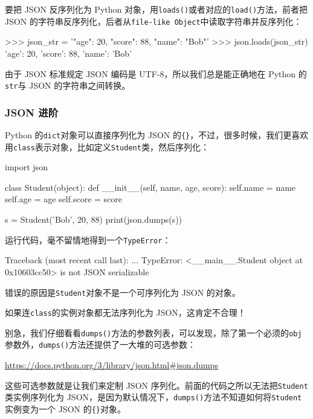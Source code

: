 要把 JSON 反序列化为 Python
对象，用\texttt{loads()}或者对应的\texttt{load()}方法，前者把 JSON
的字符串反序列化，后者从\texttt{file-like\ Object}中读取字符串并反序列化：

\begin{pythoncode}
>>> json_str = '{"age": 20, "score": 88, "name": "Bob"}'
>>> json.loads(json_str)
{'age': 20, 'score': 88, 'name': 'Bob'}
\end{pythoncode}

由于 JSON 标准规定 JSON 编码是 UTF-8，所以我们总是能正确地在 Python
的\texttt{str}与 JSON 的字符串之间转换。

\hypertarget{json-ux8fdbux9636}{%
\subsubsection{JSON 进阶}\label{json-ux8fdbux9636}}

Python 的\texttt{dict}对象可以直接序列化为 JSON
的\texttt{\{\}}，不过，很多时候，我们更喜欢用\texttt{class}表示对象，比如定义\texttt{Student}类，然后序列化：

\begin{pythoncode}
import json

class Student(object):
    def __init__(self, name, age, score):
        self.name = name
        self.age = age
        self.score = score

s = Student('Bob', 20, 88)
print(json.dumps(s))
\end{pythoncode}

运行代码，毫不留情地得到一个\texttt{TypeError}：

\begin{pythoncode}
Traceback (most recent call last):
  ...
TypeError: <__main__.Student object at 0x10603cc50> is not JSON serializable
\end{pythoncode}

错误的原因是\texttt{Student}对象不是一个可序列化为 JSON 的对象。

如果连\texttt{class}的实例对象都无法序列化为 JSON，这肯定不合理！

别急，我们仔细看看\texttt{dumps()}方法的参数列表，可以发现，除了第一个必须的\texttt{obj}参数外，\texttt{dumps()}方法还提供了一大堆的可选参数：

\url{https://docs.python.org/3/library/json.html\#json.dumps}

这些可选参数就是让我们来定制 JSON
序列化。前面的代码之所以无法把\texttt{Student}类实例序列化为
JSON，是因为默认情况下，\texttt{dumps()}方法不知道如何将\texttt{Student}实例变为一个
JSON 的\texttt{\{\}}对象。

